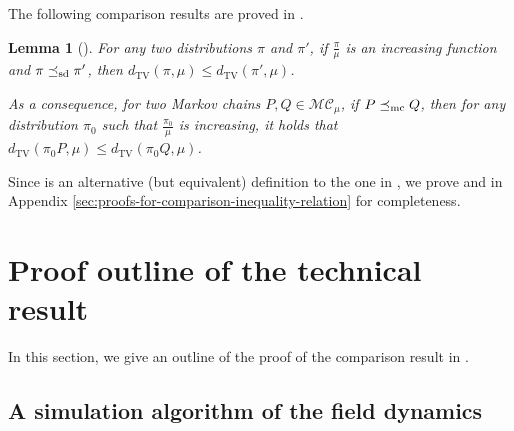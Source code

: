 \documentclass[11pt,a4paper]{article}
\newcommand{\DTV}[2]{d_{\mathrm{TV}}\left({#1},{#2}\right)}
\newcommand{\mc}{\preceq_{\textnormal{mc}}}
\newcommand{\sd}{\preceq_{\textnormal{sd}}}
\newtheorem{lemma}[theorem]{Lemma}
\theoremstyle{definition}
\def\+#1{\mathcal{#1}} %
\begin{document}
The following comparison results are proved in \cite{peres2013can,FillK13}.
\begin{lemma}[]\label{lem:gen-compare}
For any two distributions $\pi$ and $\pi'$, if $\frac{\pi}{\mu}$ is an increasing function and $\pi \sd \pi'$, then $\DTV{\pi}{\mu} \leq \DTV{\pi'}{\mu}$.     

As a consequence, for two Markov chains $P,Q \in \+{MC}_{\mu}$, if $P \mc Q$, then for any distribution $\pi_0$ such that $\frac{\pi_0}{\mu}$ is increasing, it holds that $\DTV{\pi_0 P}{\mu} \leq \DTV{\pi_0 Q}{\mu}$.
\end{lemma}

Since  is an alternative (but equivalent) definition to the one in \cite{FillK13}, we prove  and  in Appendix \ref{sec:proofs-for-comparison-inequality-relation} for completeness.



\section{Proof outline of the technical result}\label{sec:proof-outline}

In this section, we give an outline of the proof of the comparison result in .

\subsection{A simulation algorithm of the field dynamics}

\end{document}
